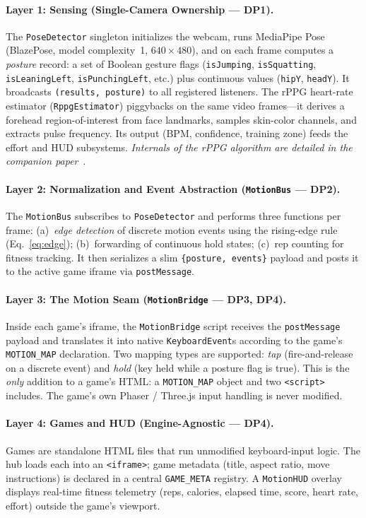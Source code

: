 \documentclass[runningheads]{llncs}
\newcommand{\motionbus}{\texttt{MotionBus}}
\newcommand{\motionbridge}{\texttt{MotionBridge}}
\newcommand{\motionmap}{\texttt{MOTION\_MAP}}
\newcommand{\postmsg}{\texttt{postMessage}}
\newcommand{\citecompanion}{\cite{companion2026}}
\begin{document}
\paragraph{Layer 1: Sensing (Single-Camera Ownership --- DP1).}
The \texttt{PoseDetector} singleton initializes the webcam, runs MediaPipe Pose
(BlazePose, model complexity~1, $640{\times}480$), and on each frame computes a
\emph{posture} record: a set of Boolean gesture flags (\texttt{isJumping},
\texttt{isSquatting}, \texttt{isLeaningLeft}, \texttt{isPunchingLeft}, etc.) plus
continuous values (\texttt{hipY}, \texttt{headY}). It broadcasts
\texttt{(results, posture)} to all registered listeners. The rPPG heart-rate
estimator (\texttt{RppgEstimator}) piggybacks on the same video frames---it
derives a forehead region-of-interest from face landmarks, samples skin-color
channels, and extracts pulse frequency. Its output (BPM, confidence, training
zone) feeds the effort and HUD subsystems. \emph{Internals of the rPPG algorithm
are detailed in the companion paper}~\citecompanion{}.

\paragraph{Layer 2: Normalization and Event Abstraction (\motionbus{} --- DP2).}
The \motionbus{} subscribes to \texttt{PoseDetector} and performs three
functions per frame: (a)~\emph{edge detection} of discrete motion events using
the rising-edge rule (Eq.~\ref{eq:edge}); (b)~forwarding of continuous hold
states; (c)~rep counting for fitness tracking. It then serializes a slim
\texttt{\{posture, events\}} payload and posts it to the active game iframe
via \postmsg{}.

\paragraph{Layer 3: The Motion Seam (\motionbridge{} --- DP3, DP4).}
Inside each game's iframe, the \motionbridge{} script receives the
\postmsg{} payload and translates it into native \texttt{KeyboardEvent}s
according to the game's \motionmap{} declaration. Two mapping types are
supported: \emph{tap} (fire-and-release on a discrete event) and \emph{hold}
(key held while a posture flag is true). This is the \emph{only} addition to
a game's HTML: a \motionmap{} object and two \texttt{<script>} includes.
The game's own Phaser / Three.js input handling is never modified.

\paragraph{Layer 4: Games and HUD (Engine-Agnostic --- DP4).}
Games are standalone HTML files that run unmodified keyboard-input logic.
The hub loads each into an \texttt{<iframe>}; game metadata (title, aspect
ratio, move instructions) is declared in a central \texttt{GAME\_META}
registry. A \texttt{MotionHUD} overlay displays real-time fitness telemetry
(reps, calories, elapsed time, score, heart rate, effort) outside the
game's viewport.
\end{document}
